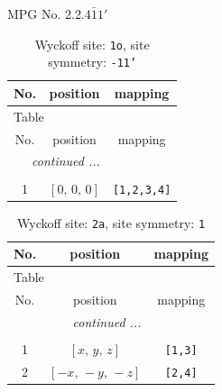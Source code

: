 \documentclass[fleqn,8pt]{jsarticle}
\begin{document}
\setcounter{MaxMatrixCols}{32}

\renewcommand{\tablename}{Table~}
\renewcommand{\figurename}{Figure~}
\begin{center}
\LARGE
MPG No. 2.2.4\quad$\bar{1}1'$
\end{center}
\renewcommand{\arraystretch}{1.2}
\begin{longtable}{ccc}
\caption{Wyckoff site: {\tt 1o}, site symmetry: {\tt -11'}}
 \\
 \hline \hline
No. & position & mapping \\ \hline \endfirsthead

\multicolumn{2}{l}{\tablename\ \thetable{}} \\
 \hline \hline
No. & position & mapping \\ \hline \endhead

 \hline \hline
\multicolumn{2}{r}{\footnotesize\it continued ...} \\ \endfoot

 \hline \hline
\multicolumn{2}{r}{} \\ \endlastfoot

1 & $\left[ 0,\, 0,\, 0 \right]$ & {\tt [1,2,3,4]} \\
\end{longtable}
\renewcommand{\arraystretch}{1.2}
\begin{longtable}{ccc}
\caption{Wyckoff site: {\tt 2a}, site symmetry: {\tt 1}}
 \\
 \hline \hline
No. & position & mapping \\ \hline \endfirsthead

\multicolumn{2}{l}{\tablename\ \thetable{}} \\
 \hline \hline
No. & position & mapping \\ \hline \endhead

 \hline \hline
\multicolumn{2}{r}{\footnotesize\it continued ...} \\ \endfoot

 \hline \hline
\multicolumn{2}{r}{} \\ \endlastfoot

1 & $\left[ x,\, y,\, z \right]$ & {\tt [1,3]} \\ \hline
2 & $\left[ - x,\, - y,\, - z \right]$ & {\tt [2,4]} \\
\end{longtable}
\end{document}
